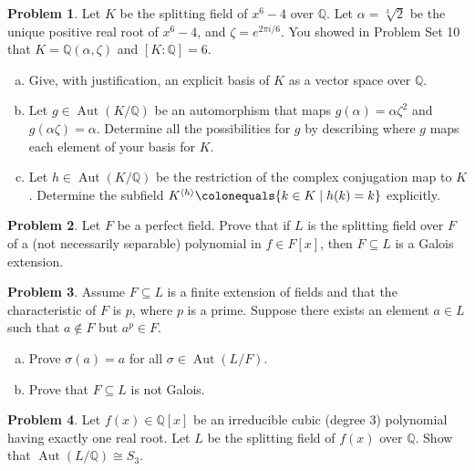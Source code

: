 \documentclass[11pt]{article}
\DeclareMathOperator{\Aut}{Aut}
\newcommand{\Q}{\mathbb{Q}}
\theoremstyle{definition}
\newtheorem{problem}{Problem}
\begin{document}
\begin{problem}
Let $K$ be the splitting field of $x^6-4$ over $\Q$. Let $\alpha = \sqrt[3]{2}$ be the unique positive real root of $x^6-4$, and $\zeta = e^{2\pi i/6}$. You showed in Problem Set 10 that $K=\Q(\alpha,\zeta)$ and $[K:\Q]=6$.

\begin{enumerate}[a)]
\item Give, with justification, an explicit basis of $K$ as a vector space over $\Q$. 

\item Let $g \in \Aut(K/\Q)$ be an automorphism that maps $g(\alpha)= \alpha\zeta^2$ and $g(\alpha\zeta)=\alpha$. Determine all the possibilities for $g$ by describing where $g$ maps each element of your basis for $K$. 

\item Let $h \in \Aut(K/\Q)$ be the restriction of the complex conjugation map to $K$. Determine the subfield $K^{\langle h \rangle} \colonequals \{k\in K \mid h(k)=k\}$ explicitly. 
\end{enumerate}
\end{problem}


\begin{problem}
Let $F$ be a perfect field. Prove that if $L$ is the splitting field over $F$ of a (not necessarily separable) polynomial in $f \in F[x]$, then $F \subseteq L$ is a Galois extension.
\end{problem}




\begin{problem}
Assume $F \subseteq L$ is a finite extension of fields and that the characteristic of $F$ is $p$, where $p$ is a prime. Suppose there exists an element $a \in L$ such that $a \notin F$ but $a^p \in F$.
\begin{enumerate}[a)]
\item Prove $\sigma(a) = a$ for all $\sigma \in \Aut(L/F)$.
\item Prove that $F \subseteq L$ is not Galois.
\end{enumerate}
\end{problem}  



\begin{problem}
	Let $f(x) \in \Q[x]$ be an irreducible cubic (degree $3$) polynomial having exactly one real root. 
Let $L$ be the splitting field of $f(x)$ over $\Q$. Show that $\Aut(L/\Q) \cong S_3$.
\end{problem}
\end{document}
